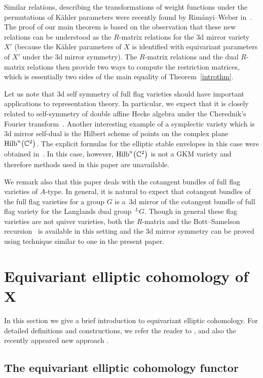 \documentclass[10pt,a4paper]{amsart}
\def\C{{\mathbb C}}
\numberwithin{equation}{section}
\begin{document}
Similar relations, describing the transformations of weight functions under the permutations of K\"ahler parameters were recently found by Rim\'anyi--Weber in~\cite{RW}. The proof of our main theorem is based on the observation that these new relations can be understood as the $R$-matrix relations for the 3d mirror variety $X'$ (because the K\"ahler parameters of $X$ is identified with equivariant parameters of $X'$ under the 3d mirror symmetry). The $R$-matrix relations and the dual $R$-matrix relations then provide two ways to compute the restriction matrices, which is essentially two sides of the main equality of Theorem~\ref{introthm}.

Let us note that 3d self symmetry of full flag varieties should have important applications to representation theory. In particular, we expect that it is closely related to self-symmetry of double affine Hecke algebra under the Cherednik's Fourier transform~\cite{Cher1}. Another interesting example of a symplectic variety which is 3d mirror self-dual is the Hilbert scheme of points on the complex plane ${\rm Hilb}^{n}\big(\C^2\big)$. The explicit formulas for the elliptic stable envelopes in this case were obtained in~\cite{EllHilb}. In this case, however, ${\rm Hilb}^{n}\big(\C^2\big)$ is not a GKM variety and therefore methods used in this paper are unavailable.

We remark also that this paper deals with the cotangent bundles of full flag varieties of $A$-type. In general, it is natural to expect that cotangent bundles of the full flag varieties for a group $G$ is a~3d mirror of the cotangent bundle of full flag variety for the Langlands dual group~$^{L}G$. Though in general these flag varieties are not quiver varieties, both the $R$-matrix and the Bott--Samelson recursion~\cite{RW} is available in this setting and the 3d mirror symmetry can be proved using technique similar to one in the present paper.

\section[Equivariant elliptic cohomology of $X$]{Equivariant elliptic cohomology of $\boldsymbol{X}$}

In this section we give a brief introduction to equivariant elliptic cohomology. For detailed definitions and constructions, we refer the reader to \cite{ell1,ell2,ell3,ell4,ell5,ell6}, and also the recently appeared new approach \cite{BT}.

\subsection{The equivariant elliptic cohomology functor}
\end{document}
